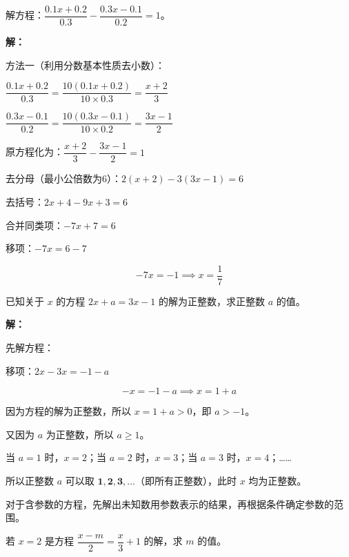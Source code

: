 \documentclass[12pt, a4paper]{ctexart}
\begin{document}
\vspace{6pt}

\begin{examplebox}[【例题4】综合：含小数的一元一次方程]
解方程：$\dfrac{0.1x+0.2}{0.3}-\dfrac{0.3x-0.1}{0.2}=1$。
\end{examplebox}

\textbf{解：}

方法一（利用分数基本性质去小数）：

$\dfrac{0.1x+0.2}{0.3}=\dfrac{10(0.1x+0.2)}{10\times 0.3}=\dfrac{x+2}{3}$

$\dfrac{0.3x-0.1}{0.2}=\dfrac{10(0.3x-0.1)}{10\times 0.2}=\dfrac{3x-1}{2}$

原方程化为：$\dfrac{x+2}{3}-\dfrac{3x-1}{2}=1$

去分母（最小公倍数为6）：$2(x+2)-3(3x-1)=6$

去括号：$2x+4-9x+3=6$

合并同类项：$-7x+7=6$

移项：$-7x=6-7$

$$-7x=-1 \implies x=\frac{1}{7}$$

\vspace{6pt}

\begin{examplebox}[【例题5】综合：含参数的方程有正整数解]
已知关于 $x$ 的方程 $2x+a=3x-1$ 的解为正整数，求正整数 $a$ 的值。
\end{examplebox}

\textbf{解：}

先解方程：

移项：$2x-3x=-1-a$

$$-x=-1-a \implies x=1+a$$

因为方程的解为正整数，所以 $x=1+a>0$，即 $a>-1$。

又因为 $a$ 为正整数，所以 $a\geqslant 1$。

当 $a=1$ 时，$x=2$；当 $a=2$ 时，$x=3$；当 $a=3$ 时，$x=4$；……

所以正整数 $a$ 可以取 $\mathbf{1,2,3,\ldots}$（即所有正整数），此时 $x$ 均为正整数。

\begin{tipbox}[方法总结]
对于含参数的方程，先解出未知数用参数表示的结果，再根据条件确定参数的范围。
\end{tipbox}

\vspace{6pt}

\begin{examplebox}
若 $x=2$ 是方程 $\dfrac{x-m}{2}=\dfrac{x}{3}+1$ 的解，求 $m$ 的值。
\end{examplebox}
\end{document}
